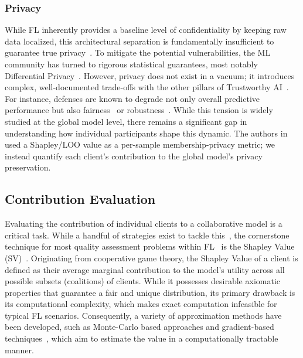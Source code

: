 \documentclass[acmsmall]{acmart}
\begin{document}
\subsubsection*{Privacy}

While FL inherently provides a baseline level of confidentiality by keeping raw data localized, this architectural separation is fundamentally insufficient to guarantee true privacy~\cite{liu2021machine}. To mitigate the potential vulnerabilities, the ML community has turned to rigorous statistical guarantees, most notably Differential Privacy~\cite{pejo2022guide}. However, privacy does not exist in a vacuum; it introduces complex, well-documented trade-offs with the other pillars of Trustworthy AI~\cite{zhang2023survey}. For instance, defenses are known to degrade not only overall predictive performance but also fairness~\cite{rafi2024fairness} or robustness~\cite{zhang2023survey}. While this tension is widely studied at the global model level, there remains a significant gap in understanding how individual participants shape this dynamic. The authors in~\cite{duddu2024shapr} used a Shapley/LOO value as a per-sample membership-privacy metric; we instead quantify each client's contribution to the global model's privacy preservation.

\subsection{Contribution Evaluation}

Evaluating the contribution of individual clients to a collaborative model is a critical task. While a handful of strategies exist to tackle this~\cite{huang2020exploratory,jiang2023opendataval}, the cornerstone technique for most quality assessment problems within FL~\cite{jain2020overview} is the Shapley Value (SV)~\cite{winter2002shapley,rozemberczki2022shapley}. Originating from cooperative game theory, the Shapley Value of a client is defined as their average marginal contribution to the model's utility across all possible subsets (coalitions) of clients. While it possesses desirable axiomatic properties that guarantee a fair and unique distribution, its primary drawback is its computational complexity, which makes exact computation infeasible for typical FL scenarios. Consequently, a variety of approximation methods have been developed, such as Monte-Carlo based approaches and gradient-based techniques~\cite{ghorbani2019data,liu2022gtg}, which aim to estimate the value in a computationally tractable manner.
\end{document}
